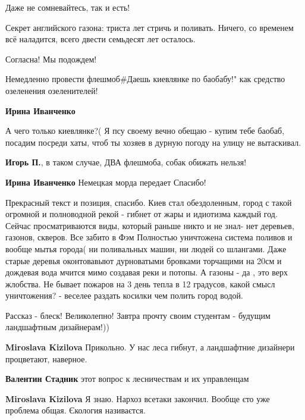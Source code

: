 \begin{itemize}
Даже не сомневайтесь, так и есть!

Секрет английского газона: триста лет стричь и поливать. Ничего, со временем
всё наладится, всего двести семьдесят лет осталось.


Согласна! Мы подождем!

Немедленно провести флешмоб\#Даешь киевлянке по баобабу!" как средство
озеленения озеленителей!

\begin{itemize} %
\textbf{Ирина Иванченко} 

А чего только киевлянке?( Я псу своему вечно обещаю - купим тебе баобаб,
посадим посреди хаты, чтоб ты хозяев в дурную погоду на улицу не вытаскивал.


\textbf{Игорь П.}, в таком случае, ДВА флешмоба, собак обижать нельзя!

\textbf{Ирина Иванченко} Немецкая морда передает Спасибо!
\end{itemize} %


Прекрасный текст и позиция, спасибо. Киев стал обездоленным, город с такой
огромной и полноводной рекой - гибнет от жары и идиотизма каждый год. Сейчас
просматриваются виды, который раньше никто и не знал- нет деревьев, газонов,
скверов. Все забито в Фэм Полностью уничтожена система поливов и вообще мытья
города( ни поливальных машин, ни людей со шлангами. Даже старые деревья
оконтовавыют дурноватыми бровками торчащими на 20см и дождевая вода мчится мимо
создавая реки и потопы. А газоны - да , это верх жлобства. Не бывает пожаров на
3 день тепла в 12 градусов, какой смысл уничтожения? - веселее раздать косилки
чем полить город водой.

Рассказ - блеск!
Великолепно!
Завтра прочту своим студентам - будущим ландшафтным дизайнерам!))

\begin{itemize} %
\textbf{Miroslava Kizilova} Прикольно. У нас леса гибнут, а ландшафтние дизайнери процветают, наверное.

\begin{itemize} %
\textbf{Валентин Стадник} этот вопрос к лесничествам и их управленцам

\textbf{Miroslava Kizilova} Я знаю. Нархоз всетаки закончил. Вообще єто уже проблема общая. Єкология називаєтся.


\end{itemize}
\end{itemize}
\end{itemize}

